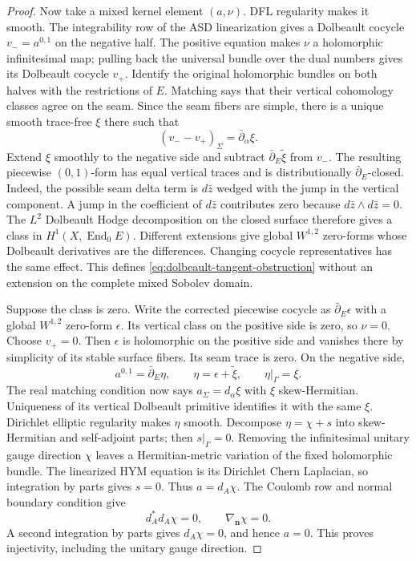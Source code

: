\documentclass[11pt]{amsart}
\theoremstyle{definition}
\theoremstyle{remark}
\theoremstyle{plain}
\newcommand{\End}{\operatorname{End}}
\begin{document}
\begin{proof}
Now take a mixed kernel element $(a,\nu)$. DFL regularity makes it
smooth. The integrability row of the ASD linearization gives a Dolbeault
cocycle $v_-=a^{0,1}$ on the negative half. The positive equation makes
$\nu$ a holomorphic infinitesimal map; pulling back the universal bundle
over the dual numbers gives its Dolbeault cocycle $v_+$. Identify the
original holomorphic bundles on both halves with the restrictions of
$E$. Matching says that their vertical cohomology classes agree on the
seam. Since the seam fibers are simple, there is a unique smooth
trace-free $\xi$ there such that
\[
 (v_--v_+)_\Sigma=\bar\partial_\alpha\xi.
\]
Extend $\xi$ smoothly to the negative side and subtract
$\bar\partial_E\widetilde\xi$ from $v_-$. The resulting piecewise
$(0,1)$-form has equal vertical traces and is distributionally
$\bar\partial_E$-closed. Indeed, the possible seam delta term is
$d\bar z$ wedged with the jump in the vertical component. A jump in the
coefficient of $d\bar z$ contributes zero because
$d\bar z\wedge d\bar z=0$. The $L^2$ Dolbeault Hodge decomposition on
the closed surface therefore gives a class in $H^1(X,\End_0E)$.
Different extensions give global $W^{1,2}$ zero-forms whose Dolbeault
derivatives are the differences. Changing cocycle representatives has
the same effect. This defines \eqref{eq:dolbeault-tangent-obstruction}
without an extension on the complete mixed Sobolev domain.

Suppose the class is zero. Write the corrected piecewise cocycle as
$\bar\partial_E\epsilon$ with a global $W^{1,2}$ zero-form $\epsilon$.
Its vertical class on the positive side is zero, so $\nu=0$. Choose
$v_+=0$. Then $\epsilon$ is holomorphic on the positive side and
vanishes there by simplicity of its stable surface fibers. Its seam
trace is zero. On the negative side,
\[
 a^{0,1}=\bar\partial_E\eta,\qquad
 \eta=\epsilon+\widetilde\xi,\qquad\eta|_\Gamma=\xi.
\]
The real matching condition now says $a_\Sigma=d_\alpha\xi$ with
$\xi$ skew-Hermitian. Uniqueness of its vertical Dolbeault primitive
identifies it with the same $\xi$. Dirichlet elliptic regularity makes
$\eta$ smooth. Decompose $\eta=\chi+s$ into skew-Hermitian and
self-adjoint parts; then $s|_\Gamma=0$. Removing the infinitesimal
unitary gauge direction $\chi$ leaves a Hermitian-metric variation of
the fixed holomorphic bundle. The linearized HYM equation is its
Dirichlet Chern Laplacian, so integration by parts gives $s=0$.
Thus $a=d_A\chi$. The Coulomb row and normal boundary condition give
\[
 d_A^*d_A\chi=0,\qquad \nabla_{\mathbf n}\chi=0.
\]
A second integration by parts gives $d_A\chi=0$, and hence $a=0$.
This proves injectivity, including the unitary gauge direction.


\end{proof}
\end{document}
